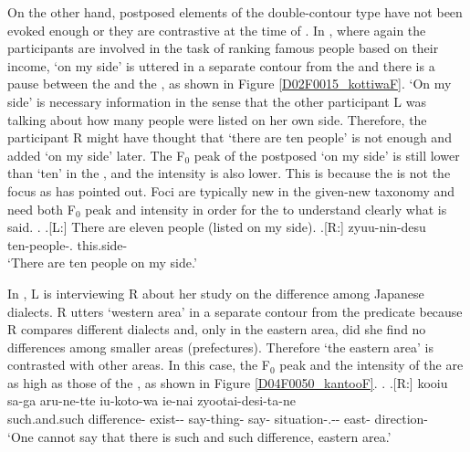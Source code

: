 On the other hand,
postposed elements of the double-contour type have not been evoked enough or they are contrastive at the time of .
In \Next, where again the participants are involved in the task of ranking famous people based on their income,
 `on my side' is uttered in a separate contour from the  and there is a pause between the  and the , as shown in Figure \ref{D02F0015_kottiwaF}.
`On my side' is necessary information in the sense that
the other participant L was talking about how many people were listed on her own side.
Therefore, the participant R might have thought that `there are ten people' is not enough and added `on my side' later.
The F$_{0}$ peak of the postposed  `on my side' is still lower than  `ten' in the ,
and the intensity is also lower.
This is because the  is not the focus as  has pointed out.
Foci are typically new in the given-new taxonomy and need both F$_{0}$ peak and intensity in order for the  to understand clearly what is said.
%
\ex.\label{D02F0015_kottiwa}
 \a.[L:] There are eleven people (listed on my side).
 \bg.[R:] zyuu-nin-desu  \\
 		ten-people-. this.side- \\
		`There are ten people on my side.'


In \Next,
L is interviewing R about her study on the difference among Japanese dialects.
R utters `western area' in a separate contour from the predicate
because R compares different dialects and, only in the eastern area, did she find no differences among smaller areas (prefectures).
Therefore `the eastern area' is contrasted with other areas.
In this case, the F$_{0}$ peak and the intensity of the  are as high as those of the ,
as shown in Figure \ref{D04F0050_kantooF}.
%
\ex.\label{D04F0050_kantoo}
 \ag.[R:] kooiu sa-ga aru-ne-tte iu-koto-wa ie-nai zyootai-desi-ta-ne   \\
 	such.and.such difference- exist-- say-thing- say- situation-.-- east- direction- \\
	`One cannot say that there is such and such difference, eastern area.'

